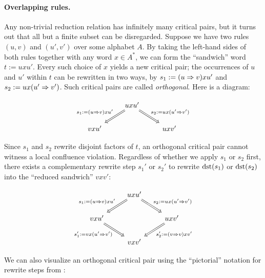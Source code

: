 \documentclass[../generics]{subfiles}
\begin{document}
\paragraph{Overlapping rules.}
Any non-trivial reduction relation has infinitely many critical pairs, but it turns out that all but a finite subset can be disregarded. Suppose we have two rules $(u, v)$ and $(u', v')$ over some alphabet $A$. By taking the left-hand sides of both rules together with any word $x\in A^*$, we can form the ``sandwich'' word $t := uxu'$. Every such choice of $x$ yields a new critical pair; the occurrences of $u$ and $u'$ within $t$ can be rewritten in two ways, by $s_1 := (u\Rightarrow v)xu'$ and $s_2 := ux(u'\Rightarrow v')$. Such critical pairs are called \emph{orthogonal}. Here is a diagram:
\begin{ceqn}
\[
\begin{tikzcd}
&uxu'\arrow[ld, Rightarrow, "s_1:=(u\Red v)xu'"']\arrow[rd, Rightarrow, "s_2:=ux(u'\Red v')"]\\
vxu'&&uxv'
\end{tikzcd}
\]
\end{ceqn}
Since $s_1$ and $s_2$ rewrite disjoint factors of $t$, an orthogonal critical pair cannot witness a local confluence violation. Regardless of whether we apply $s_1$ or $s_2$ first, there exists a complementary rewrite step $s_1'$ or $s_2'$ to rewrite $\operatorname{dst}(s_1)$ or $\operatorname{dst}(s_2)$ into the ``reduced sandwich'' $vxv'$:
\begin{ceqn}
\[
\begin{tikzcd}
&uxu'\arrow[ld, Rightarrow, "s_1:=(u\Red v)xu'"']\arrow[rd, Rightarrow, "s_2:=ux(u'\Red v')"]\\
vxu'\arrow[rd, Rightarrow, "s_1' := vx(u'\Red v')"']&&uxv'\arrow[ld, Rightarrow, "s_2':=(v\Red v)xv'"]\\
&vxv'
\end{tikzcd}
\]
\end{ceqn}
We can also visualize an orthogonal critical pair using the ``pictorial'' notation for rewrite steps from :
\end{document}
